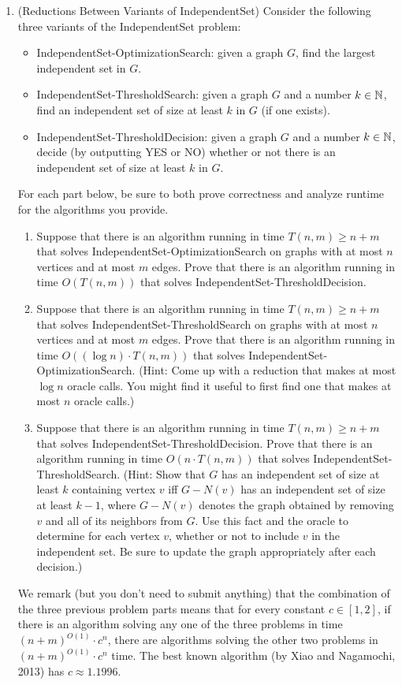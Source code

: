 \documentclass[11pt]{article}
\begin{document}
\begin{enumerate}
 \item (Reductions Between Variants of IndependentSet) 
 Consider the following three variants of the IndependentSet problem:
 \begin{itemize}
     \item IndependentSet-OptimizationSearch: given a graph $G$, find the largest independent set in $G$.
     \item IndependentSet-ThresholdSearch: given a graph $G$ and a number $k\in \mathbb{N}$, find an independent set of size at least $k$ in $G$ (if one exists).
     \item IndependentSet-ThresholdDecision: given a graph $G$ and a number $k\in \mathbb{N}$, decide (by outputting YES or NO) whether or not there is an independent set of size at least $k$ in $G$. 
 \end{itemize}
For each part below, be sure to both prove correctness and analyze runtime for the algorithms you provide.

 \begin{enumerate}
 \item Suppose that there is an algorithm running in time $T(n,m)\geq n+m$ that solves IndependentSet-OptimizationSearch on graphs with at most $n$ vertices and at most $m$ edges.  Prove that there is an algorithm running in time $O(T(n,m))$ that solves IndependentSet-ThresholdDecision. 
 \item Suppose that there is an algorithm running in time $T(n,m)\geq n+m$ that solves IndependentSet-ThresholdSearch on graphs with at most $n$ vertices and at most $m$ edges.  Prove that there is an algorithm running in time $O((\log n)\cdot T(n,m))$ that solves IndependentSet-OptimizationSearch.  (Hint: Come up with a reduction that makes at most $\log n$ oracle calls.  You might find it useful to first find one that makes at most $n$ oracle calls.)
  \item Suppose that there is an algorithm 
 running in time $T(n,m)\geq n+m$ that solves IndependentSet-ThresholdDecision.   Prove that there is an algorithm running in time $O(n\cdot T(n,m))$ that solves IndependentSet-ThresholdSearch.
(Hint: Show that $G$ has an independent set of size at least $k$ containing vertex $v$ iff $G-N(v)$ has an independent set of size at least $k-1$, where $G-N(v)$ denotes the graph obtained by removing $v$ and all of its neighbors from $G$.  Use this fact and the oracle to determine for each vertex $v$, whether or not to include $v$ in the independent set.  Be sure to update the graph appropriately after each decision.)
 \end{enumerate}
 We remark (but you don't need to submit anything) that the combination of the three previous problem parts means that for every constant $c\in [1,2]$, if there is an algorithm solving any one of the three problems in time $(n+m)^{O(1)}\cdot c^n$, there are algorithms solving the other two problems in $(n+m)^{O(1)}\cdot c^n$ time.  The best known algorithm (by Xiao and Nagamochi, 2013) has $c \approx 1.1996$.
 
\end{enumerate}
\end{document}
